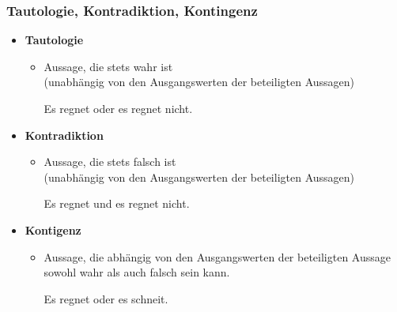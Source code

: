 
\begin{frame}
\frametitle{Tautologie, Kontradiktion, Kontingenz}

\begin{itemize}
	\item \textbf{Tautologie}
	
	\begin{itemize}
	\item Aussage, die stets wahr ist\\
          (unabhängig von den Ausgangswerten der beteiligten Aussagen)
		
		\ea Es regnet oder es regnet nicht.
		\z
		
	\end{itemize}
	
	\item \textbf{Kontradiktion}
	
	\begin{itemize}
	\item  Aussage, die stets falsch ist\\
          (unabhängig von den Ausgangswerten der beteiligten Aussagen)

		\ea Es regnet und es regnet nicht.
		\z
		
	\end{itemize}
	
	\item \textbf{Kontigenz}
	
	\begin{itemize}
		\item Aussage, die abhängig von den Ausgangswerten der beteiligten Aussage sowohl wahr als auch falsch sein kann.

		\ea Es regnet oder es schneit.
		\z

	\end{itemize}
	
\end{itemize}


\end{frame}



